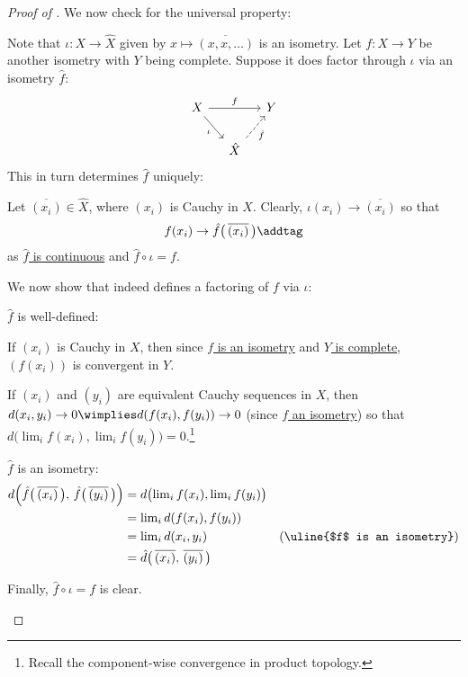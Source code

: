 \begin{proof}[Proof of ]
		\noindent We now check for the universal property:
		\begin{subproof}
			Note that $\iota\colon X\to\hat X$ given by $x\mapsto \overline{(x, x, \ldots)}$ is an isometry. Let $f\colon X\to Y$ be another isometry with $Y$ being complete. Suppose it does factor through $\iota$ via an isometry $\hat f$:
			\[
			\begin{tikzcd}[column sep=small]
				X\ar[dr, "\iota"']\ar[rr, "f"] && Y\\
				& \hat X\ar[ur, dashed, "\hat f"'] &
			\end{tikzcd}
			\]
			This in turn determines $\hat f$ uniquely:
			\begin{subproof}
				Let $\overline{(x_i)}\in\hat X$, where $(x_i)$ is Cauchy in $X$. Clearly, $\iota(x_i)\to\overline{(x_i)}$ so that
				\[
				f(x_i)\to \hat f\bigl(\, \overline{(x_i)} \,\bigr) \addtag\label{EQN: metric completion proof}
				\]
				as \uline{$\hat f$ is continuous} and \uline{$\hat f\circ \iota = f$}.
			\end{subproof}
			We now show that  indeed defines a factoring of $f$ via $\iota$:
			\begin{prooflist}
				\item $\hat f$ is well-defined:
				\begin{rmklist}
					\item If $(x_i)$ is Cauchy in $X$, then since \uline{$f$ is an isometry} and \uline{$Y$ is complete}, $(f(x_i))$ is convergent in $Y$.
					
					\item If $(x_i)$ and $(y_i)$ are equivalent Cauchy sequences in $X$, then $d(x_i, y_i)\to 0\wimplies d(f(x_i), f(y_i))\to 0$ (since \uline{$f$ an isometry}) so that $d\bigl(\lim_i f(x_i), \lim_i f(y_i)\bigr) = 0$.\footnote{Recall the component-wise convergence in product topology.}
				\end{rmklist}
				
				\item $\hat f$ is an isometry:
				\begin{alignat*}{2}
					d\Bigl( \hat f\bigl(\, \overline{(x_i)} \,\bigr),\, \hat f\bigl(\, \overline{(y_i)} \,\bigr) \Bigr)
					& = d\bigl(\lim\nolimits_i f(x_i), \lim\nolimits_i f(y_i)\bigr)\\
					& = \lim\nolimits_i d(f(x_i), f(y_i))\\
					& = \lim\nolimits_i d(x_i, y_i) & \text{(\uline{$f$ is an isometry})}\\
					& = \hat d\bigl(\, \overline{(x_i)},\, \overline{(y_i)} \,\bigr)
				\end{alignat*}
				
				\item Finally, $\hat f\circ \iota = f$ is clear.\qedhere
			\end{prooflist}
		\end{subproof}
	\end{proof}
	
